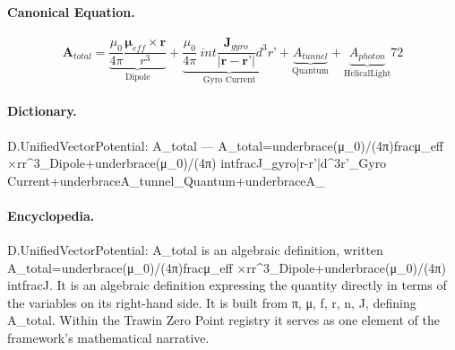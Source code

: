 \paragraph{Canonical Equation.}
\[
\mathbf{A}_{total}=\underbrace{\frac{\mu_0}{4\pi}\frac{\boldsymbol{\mu}_{eff} \times\mathbf{r}}{r^3}}_{\text{Dipole}}+\underbrace{\frac{\mu_0}{4\pi}\ int\frac{\mathbf{J}_{gyro}}{|\mathbf{r}-\mathbf{r}’|}d^3r’}_{\text{Gyro Current}}+\underbrace{A_{tunnel}}_{\text{Quantum}}+\underbrace{A_{ photon}}_{\text{HelicalLight}} 72
\]

\paragraph{Dictionary.}
D.UnifiedVectorPotential: A\_total — A\_total=underbrace(μ\_0)/(4π)fracμ\_eff ×rr\textasciicircum{}3\_Dipole+underbrace(μ\_0)/(4π) intfracJ\_gyro|r-r’|d\textasciicircum{}3r’\_Gyro Current+underbraceA\_tunnel\_Quantum+underbraceA\_

\paragraph{Encyclopedia.}
D.UnifiedVectorPotential: A\_total is an algebraic definition, written A\_total=underbrace(μ\_0)/(4π)fracμ\_eff ×rr\textasciicircum{}3\_Dipole+underbrace(μ\_0)/(4π) intfracJ. It is an algebraic definition expressing the quantity directly in terms of the variables on its right-hand side. It is built from π, μ, f, r, n, J, defining A\_total. Within the Trawin Zero Point registry it serves as one element of the framework's mathematical narrative.
